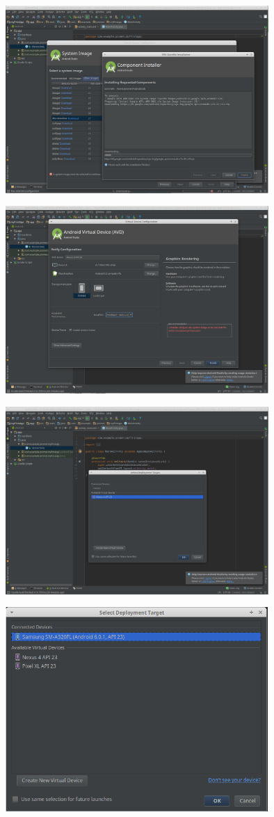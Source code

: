 \documentclass[french,a4paper,12pt]{report}
\begin{document}
\includegraphics[width=10cm]{10.png}

\includegraphics[width=10cm]{11.png}

\includegraphics[width=10cm]{12.png}

\includegraphics[width=10cm]{121.png}
\end{document}
